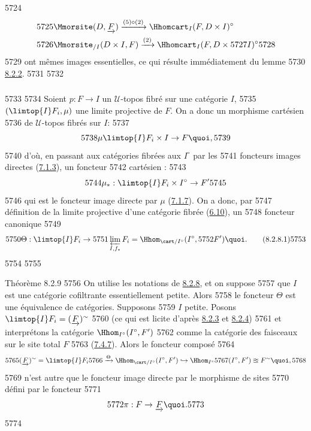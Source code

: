   5724	\begin{align*}
  5725	& \Mmorsite(D, \underrightarrow{F}) \xrightarrow{(5) \circ (2)} \Hhomcart_I(F, D \times I)^{\circ}\\
  5726	& \Mmorsite_{/I}(D \times I, F) \xrightarrow{(2)} \Hhomcart_I(F, D \times
  5727	I)^{\circ}
  5728	\end{align*}
  5729	ont mêmes images essentielles, ce qui résulte immédiatement du lemme
  5730	\hyperref[VI.lem8.2.2]{8.2.2}.
  5731	
  5732	\subsubsection{}
  5733	
  5734	Soient $p : F \to I$ un $𝒰$-topos fibré sur une catégorie $I$,
  5735	$(\limtop{I} F_i, \mu)$ une limite projective de $F$. On a donc un morphisme cartésien
  5736	de $𝒰$-topos fibrés sur $I$:
  5737	$$
  5738	\mu \limtop{I} F_i \times I \to F{\quoi},
  5739	$$
  5740	d'où, en passant aux catégories fibrées aux $I^{\circ}$ par les
  5741	foncteurs images directes (\hyperref[VI.subsubsec7.1.3]{7.1.3}), un foncteur
  5742	cartésien :
  5743	$$
  5744	\mu_{\ast}: \limtop{I} F_i \times I^{\circ} \to F'
  5745	$$
  5746	qui est le foncteur image directe par $\mu$ (\hyperref[VI.subsubsec7.1.7]{7.1.7}). On a donc, par
  5747	définition de la limite projective d'une catégorie fibrée (\hyperref[VI.subsec6.10]{6.10}), un
  5748	foncteur canonique
  5749	\begin{equation*}
  5750	\Theta : \limtop{I} F_i  \to
  5751	\varprojlim_{I, f_{\ast}} F_i = \Hhom_{\cart/I^{\circ}} (I^{\circ},
  5752	F'){\quoi}.\tag{8.2.8.1}
  5753	\end{equation*}
  5754	
  5755	\begin{enonce*}{Théorème 8.2.9}
  5756	On utilise les notations de \hyperref[VI.subsubsec8.2.8]{8.2.8}, et on suppose
  5757	que $I$ est une catégorie cofiltrante essentiellement petite. Alors
  5758	le foncteur $\Theta$ est une équivalence de catégories. Supposons
  5759	$I$ petite. Posons $\limtop{I} F_i = (\underrightarrow{F})^{\sim}$
  5760	(ce qui est licite d'après \hyperref[VI.thm8.2.3]{8.2.3} et \hyperref[VI.rem8.2.4]{8.2.4})
  5761	et interprétons la catégorie $\Hhom_{I^{\circ}} (I^{\circ}, F')$
  5762	comme la catégorie des faisceaux sur le site total $F$
  5763	(\hyperref[VI.prop7.4.7]{7.4.7}). Alors le foncteur composé
  5764	$$
  5765	(\underrightarrow{F})^{\sim} = \limtop{I} F_i
  5766	\xrightarrow{\Theta} \Hhom_{\cart/I^{\circ}} (I^{\circ}, F') \hookrightarrow \Hhom_{I^{\circ}}
  5767	(I^{\circ}, F') \approxeq F^{\sim}{\quoi},
  5768	$$
  5769	n'est autre que le foncteur image directe par le morphisme de sites
  5770	défini par le foncteur
  5771	$$
  5772	\pi : F \to \underrightarrow{F}{\quoi}.
  5773	$$
  5774	\end{enonce*}

